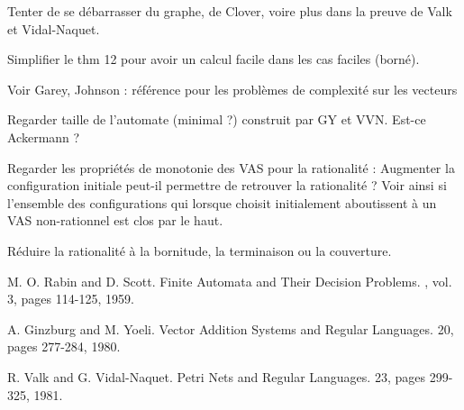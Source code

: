 \documentclass[a4paper,final]{article}
\theoremstyle{definition}
\begin{document}
Tenter de se débarrasser du graphe, de Clover, voire plus dans la preuve de Valk et Vidal-Naquet.

Simplifier le thm 12 pour avoir un calcul facile dans les cas faciles (borné).

Voir Garey, Johnson : référence pour les problèmes de complexité sur les vecteurs

Regarder taille de l'automate (minimal ?) construit par GY et VVN. Est-ce Ackermann ?

Regarder les propriétés de monotonie des VAS pour la rationalité : 
Augmenter la configuration initiale peut-il permettre de retrouver la rationalité ?
Voir ainsi si l'ensemble des configurations qui lorsque choisit initialement aboutissent à un VAS non-rationnel est clos par le haut.

Réduire la rationalité à la bornitude, la terminaison ou la couverture.


\begin{thebibliography}{10}

M. O. Rabin and D. Scott.
\newblock Finite Automata and Their Decision Problems.
, vol. 3, pages 114-125, 1959.

A. Ginzburg and M. Yoeli.
\newblock Vector Addition Systems and Regular Languages.
 20, pages 277-284, 1980.

R. Valk and G. Vidal-Naquet.
\newblock Petri Nets and Regular Languages.
 23, pages 299-325, 1981.

%


\end{thebibliography}
\end{document}
